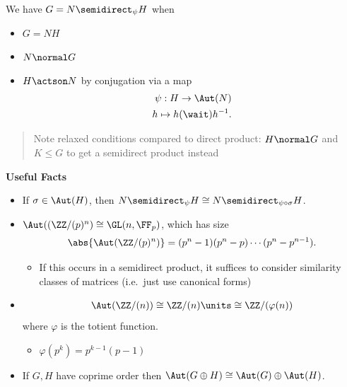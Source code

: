 \begin{theorem}

We have \(G = N \semidirect_\psi H\) when

\begin{itemize}
\item
  \(G = NH\)
\item
  \(N \normal G\)
\item
  \(H \actson N\) by conjugation via a map
  \begin{align*}  
  \psi: H \to \Aut(N) \\
  h \mapsto h(\wait)h^{-1}
  .\end{align*}
\end{itemize}

\begin{quote}
Note relaxed conditions compared to direct product: \(H\normal G\) and
\(K\leq G\) to get a semidirect product instead
\end{quote}

\end{theorem}

\textbf{Useful Facts}

\begin{itemize}
\item
  If \(\sigma \in \Aut(H)\), then
  \(N \semidirect_\psi H \cong N \semidirect_{\psi \circ \sigma} H\).
\item
  \(\Aut((\ZZ/(p)^n) \cong \GL(n, \FF_p)\), which has size
  \begin{align*}  
  \abs{\Aut(\ZZ/(p)^n)} = (p^n-1)(p^n-p)\cdots(p^n-p^{n-1})
  .\end{align*}

  \begin{itemize}
  \tightlist
  \item
    If this occurs in a semidirect product, it suffices to consider
    similarity classes of matrices (i.e.~just use canonical forms)
  \end{itemize}
\item

  \begin{align*} \Aut(\ZZ/(n)) \cong \ZZ/(n)\units \cong \ZZ/({\varphi(n)})\end{align*}
  where \(\varphi\) is the totient function.

  \begin{itemize}
  \tightlist
  \item
    \(\varphi(p^k) = p^{k-1}(p-1)\)
  \end{itemize}
\item
  If \(G, H\) have coprime order then
  \(\Aut(G\oplus H) \cong \Aut(G) \oplus \Aut(H)\).
\end{itemize}


